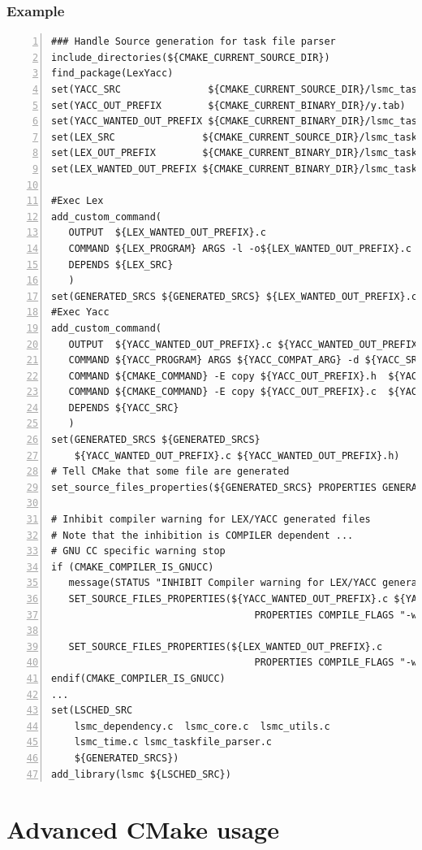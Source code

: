 \documentclass[compress,slidestop,table
              ]
               {beamer}
\begin{document}
\begin{frame}
\frametitle{Example}
\begin{lstlisting}[basicstyle=\tiny,numbers=left]
### Handle Source generation for task file parser
include_directories(${CMAKE_CURRENT_SOURCE_DIR})
find_package(LexYacc)
set(YACC_SRC               ${CMAKE_CURRENT_SOURCE_DIR}/lsmc_taskfile_syntax.yy)
set(YACC_OUT_PREFIX        ${CMAKE_CURRENT_BINARY_DIR}/y.tab)
set(YACC_WANTED_OUT_PREFIX ${CMAKE_CURRENT_BINARY_DIR}/lsmc_taskfile_syntax)
set(LEX_SRC               ${CMAKE_CURRENT_SOURCE_DIR}/lsmc_taskfile_tokens.ll)
set(LEX_OUT_PREFIX        ${CMAKE_CURRENT_BINARY_DIR}/lsmc_taskfile_tokens_yy)
set(LEX_WANTED_OUT_PREFIX ${CMAKE_CURRENT_BINARY_DIR}/lsmc_taskfile_tokens)

#Exec Lex
add_custom_command(
   OUTPUT  ${LEX_WANTED_OUT_PREFIX}.c
   COMMAND ${LEX_PROGRAM} ARGS -l -o${LEX_WANTED_OUT_PREFIX}.c ${LEX_SRC}
   DEPENDS ${LEX_SRC}
   )
set(GENERATED_SRCS ${GENERATED_SRCS} ${LEX_WANTED_OUT_PREFIX}.c)
#Exec Yacc
add_custom_command(
   OUTPUT  ${YACC_WANTED_OUT_PREFIX}.c ${YACC_WANTED_OUT_PREFIX}.h
   COMMAND ${YACC_PROGRAM} ARGS ${YACC_COMPAT_ARG} -d ${YACC_SRC}
   COMMAND ${CMAKE_COMMAND} -E copy ${YACC_OUT_PREFIX}.h  ${YACC_WANTED_OUT_PREFIX}.h
   COMMAND ${CMAKE_COMMAND} -E copy ${YACC_OUT_PREFIX}.c  ${YACC_WANTED_OUT_PREFIX}.c
   DEPENDS ${YACC_SRC}
   )
set(GENERATED_SRCS ${GENERATED_SRCS}
    ${YACC_WANTED_OUT_PREFIX}.c ${YACC_WANTED_OUT_PREFIX}.h)
# Tell CMake that some file are generated
set_source_files_properties(${GENERATED_SRCS} PROPERTIES GENERATED TRUE)

# Inhibit compiler warning for LEX/YACC generated files
# Note that the inhibition is COMPILER dependent ...
# GNU CC specific warning stop
if (CMAKE_COMPILER_IS_GNUCC)
   message(STATUS "INHIBIT Compiler warning for LEX/YACC generated files")
   SET_SOURCE_FILES_PROPERTIES(${YACC_WANTED_OUT_PREFIX}.c ${YACC_WANTED_OUT_PREFIX}.h
                                   PROPERTIES COMPILE_FLAGS "-w")

   SET_SOURCE_FILES_PROPERTIES(${LEX_WANTED_OUT_PREFIX}.c
                                   PROPERTIES COMPILE_FLAGS "-w")
endif(CMAKE_COMPILER_IS_GNUCC)
...
set(LSCHED_SRC
    lsmc_dependency.c  lsmc_core.c  lsmc_utils.c
    lsmc_time.c lsmc_taskfile_parser.c
    ${GENERATED_SRCS})
add_library(lsmc ${LSCHED_SRC})
\end{lstlisting}
\end{frame}

\section{Advanced CMake usage}
\end{document}
